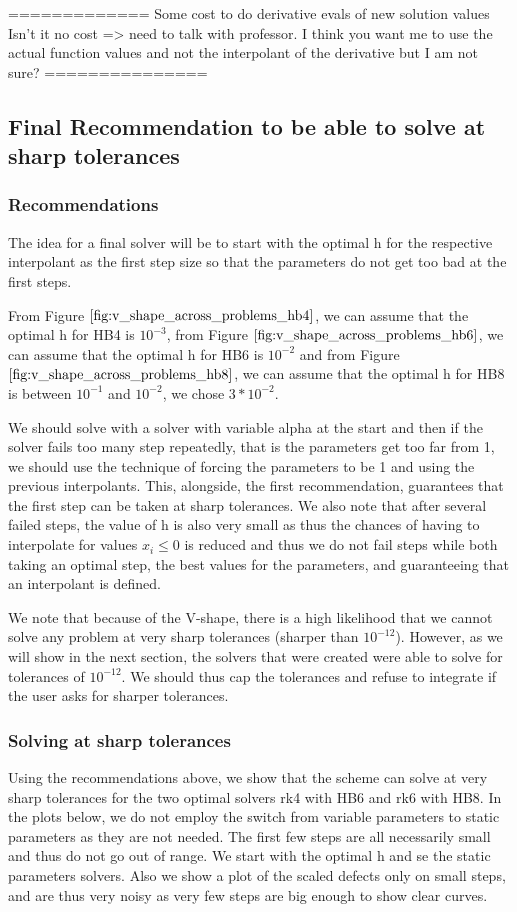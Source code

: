 \documentclass{article}
\begin{document}
	
=============
Some cost to do derivative evals of new solution values
Isn't it no cost => need to talk with professor.
I think you want me to use the actual function values and not the interpolant of the derivative but I am not sure?
===============

\subsection{Final Recommendation to be able to solve at sharp tolerances}
\subsubsection{Recommendations}
The idea for a final solver will be to start with the optimal h for the respective interpolant as the first step size so that the parameters do not get too bad at the first steps.

From Figure $\ref{fig:v_shape_across_problems_hb4}$, we can assume that the optimal h for HB4 is $10^{-3}$, from Figure $\ref{fig:v_shape_across_problems_hb6}$, we can assume that the optimal h for HB6 is $10^{-2}$ and from Figure $\ref{fig:v_shape_across_problems_hb8}$, we can assume that the optimal h for HB8 is between $10^{-1}$ and $10^{-2}$, we chose $3*10^{-2}$.

We should solve with a solver with variable alpha at the start and then if the solver fails too many step repeatedly, that is the parameters get too far from 1, we should use the technique of forcing the parameters to be 1 and using the previous interpolants. This, alongside, the first recommendation, guarantees that the first step can be taken at sharp tolerances. We also note that after several failed steps, the value of h is also very small as thus the chances of having to interpolate for values $x_i \leq 0$ is reduced and thus we do not fail steps while both taking an optimal step, the best values for the parameters, and guaranteeing that an interpolant is defined. 

We note that because of the V-shape, there is a high likelihood that we cannot solve any problem at very sharp tolerances (sharper than $10^{-12}$). However, as we will show in the next section, the solvers that were created were able to solve for tolerances of $10^{-12}$. We should thus cap the tolerances and refuse to integrate if the user asks for sharper tolerances.

\subsubsection{Solving at sharp tolerances}
Using the recommendations above, we show that the scheme can solve at very sharp tolerances for the two optimal solvers rk4 with HB6 and rk6 with HB8. In the plots below, we do not employ the switch from variable parameters to static parameters as they are not needed. The first few steps are all necessarily small and thus do not go out of range. We start with the optimal h and se the static parameters solvers. Also we show a plot of the scaled defects only on small steps, and are thus very noisy as very few steps are big enough to show clear curves.
\end{document}
